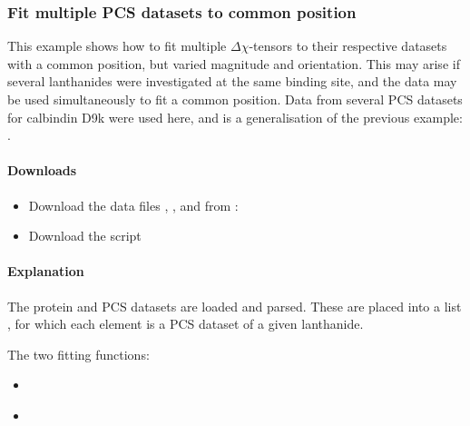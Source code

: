 \documentclass[a4paper,10pt,english]{sphinxmanual}
\begin{document}
\subsubsection{Fit multiple PCS datasets to common position}
\label{\detokenize{examples/pcs_fit_multiple:fit-multiple-pcs-datasets-to-common-position}}\label{\detokenize{examples/pcs_fit_multiple:pcs-fit-multiple}}\label{\detokenize{examples/pcs_fit_multiple::doc}}
This example shows how to fit multiple \({\Delta\chi}\)-tensors to their respective datasets with a common position, but varied magnitude and orientation. This may arise if several lanthanides were investigated at the same binding site, and the data may be used simultaneously to fit a common position. Data from several PCS datasets for calbindin D9k were used here, and is a generalisation of the previous example: {\hyperref[\detokenize{examples/pcs_fit:pcs-fit}]{}}.


\paragraph{Downloads}
\label{\detokenize{examples/pcs_fit_multiple:downloads}}\begin{itemize}
\item {} 
Download the data files , ,  and  from :

\item {} 
Download the script 

\end{itemize}


\paragraph{Explanation}
\label{\detokenize{examples/pcs_fit_multiple:explanation}}
The protein and PCS datasets are loaded and parsed. These are placed into a list , for which each element is a PCS dataset of a given lanthanide.

The two fitting functions:
\begin{itemize}
\item {} 
{\hyperref[\detokenize{reference/generated/paramagpy.fit.svd_gridsearch_fit_metal_from_pcs:paramagpy.fit.svd_gridsearch_fit_metal_from_pcs}]{}}

\item {} 
{\hyperref[\detokenize{reference/generated/paramagpy.fit.nlr_fit_metal_from_pcs:paramagpy.fit.nlr_fit_metal_from_pcs}]{}}

\end{itemize}
\end{document}
